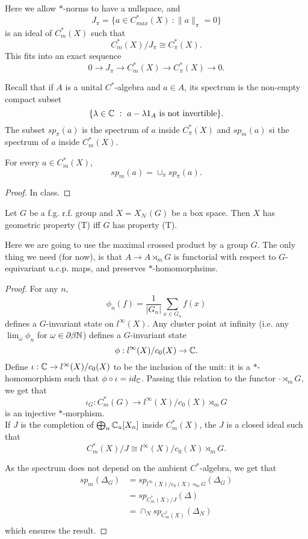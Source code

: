 Here we allow $*$-norms to have a nullspace, and
\[J_\pi = \{a\in C^*_{max}(X) \ : \|a\|_\pi = 0\}\]
is an ideal of $C^*_m(X)$ such that 
\[C^*_{m}(X)/J_\pi\cong C^*_\pi(X).\] 
This fits into an exact sequence 
\[ 0 \rightarrow J_\pi \rightarrow C^*_m(X) \rightarrow C^*_\pi(X)\rightarrow 0.\]

Recall that if $A$ is a unital $C^*$-algebra and $a\in A$, its spectrum is the non-empty compact subset 
\[\{\lambda \in \mathbb C \ : \ a-\lambda 1_A \text{ is not invertible}\}.\]
The subset $sp_\pi(a)$ is the spectrum of $a$ inside $C^*_\pi(X)$ and $sp_{m}(a)$ si the spectrum of $a$ inside $C^*_m(X)$.

\begin{prop}
For every $a\in C^*_m(X)$,
\[sp_m(a) = \cup_\pi sp_\pi(a).\]\end{prop}

\begin{proof}
In class.
\end{proof}

\begin{thm}[Willett-Yu]
Let $G$ be a f.g. r.f. group and $X= X_{\mathcal N}(G)$ be a box space. Then $X$ has geometric property (T) iff $G$ has property (T).
\end{thm}

Here we are going to use the maximal crossed product by a group $G$. The only thing we need (for now), is that $A\rightarrow A\rtimes_m G$ is functorial with respect to $G$-equivariant u.c.p. maps, and preserves $*$-homomorphsims.

\begin{proof}
For any $n$,
\[\phi_n(f) = \frac{1}{|G_n|}\sum_{x\in G_n} f(x)\]
defines a $G$-invariant state on $l^\infty (X)$. Any cluster point at infinity (i.e. any $\lim_{\omega} \phi_n$ for $\omega \in \partial \beta \mathbb N$) defines a $G$-invariant state 
\[\phi : l^\infty(X)/c_0(X)\rightarrow \mathbb C. \]
Define $\iota: \mathbb C \rightarrow l^\infty(X)/c_0(X)  $ to be the inclusion of the unit: it is a $*$-homomorphism such that $\phi\circ \iota = id_\mathbb C$. Passing this relation to the functor $\cdot \rtimes_m G$, we get that 
\[\iota_G : C^*_m(G)\rightarrow l^\infty(X)/c_0(X)\rtimes_m G \]
is an injective $*$-morphism.\\

If $J$ is the completion of $\bigoplus_n \mathbb C_u[X_n]$ inside $C^*_m(X)$, the $J$ is a closed ideal such that 
\[C^*_m(X)/J \cong l^\infty(X)/c_0(X)\rtimes_m G .\] 

As the spectrum does not depend on the ambient $C^*$-algebra, we get that 
\[\begin{split}
sp_{m} (\Delta_G) & = sp_{l^\infty(X)/c_0(X)\rtimes_m G} (\Delta_G) \\ 
			& = sp_{C^*_m(X)/J} (\Delta) \\
			& = \cap_N sp_{C^*_m(X)}(\Delta_N)\\
\end{split}\]
which ensures the result.
\end{proof} 

